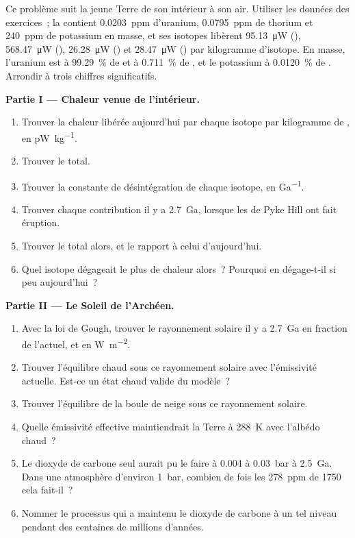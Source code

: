 \begin{problem}\label{pb:b2:precambrian-earth:1}
Ce problème suit la jeune Terre de son intérieur à son air. Utiliser les données des
exercices~; la  contient \qty{0.0203}{ppm} d'uranium, \qty{0.0795}{ppm} de
thorium et \qty{240}{ppm} de potassium en masse, et ses isotopes libèrent \qty{95.13}{\micro W}
(), \qty{568.47}{\micro W} (), \qty{26.28}{\micro W} () et
\qty{28.47}{\micro W} () par kilogramme d'isotope. En masse, l'uranium est
à \qty{99.29}{\percent} de  et à \qty{0.711}{\percent} de , et le potassium
à \qty{0.0120}{\percent} de . Arrondir à trois chiffres significatifs.

\noindent\textbf{Partie I --- Chaleur venue de l'intérieur.}
\begin{enumerate}
  \item Trouver la chaleur libérée aujourd'hui par chaque isotope par kilogramme de , en
        \unit{pW.kg^{-1}}.
  \item Trouver le total.
  \item Trouver la constante de désintégration de chaque isotope, en \unit{Ga^{-1}}.
  \item Trouver chaque contribution il y a \qty{2.7}{Ga}, lorsque les  de Pyke Hill ont fait éruption.
  \item Trouver le total alors, et le rapport à celui d'aujourd'hui.
  \item Quel isotope dégageait le plus de chaleur alors~? Pourquoi en dégage-t-il si peu aujourd'hui~?
\end{enumerate}

\noindent\textbf{Partie II --- Le Soleil de l'Archéen.}
\begin{enumerate}[resume]
  \item Avec la loi de Gough, trouver le rayonnement solaire il y a \qty{2.7}{Ga} en fraction de l'actuel, et en
        \unit{W.m^{-2}}.
  \item Trouver l'équilibre chaud sous ce rayonnement solaire avec l'émissivité actuelle. Est-ce un état chaud
        valide du modèle~?
  \item Trouver l'équilibre de la boule de neige sous ce rayonnement solaire.
  \item Quelle émissivité effective maintiendrait la Terre à \qty{288}{K} avec l'albédo chaud~?
  \item Le dioxyde de carbone seul aurait pu le faire à 0.004 à \qty{0.03}{bar} à \qty{2.5}{Ga}.
        Dans une atmosphère d'environ \qty{1}{bar}, combien de fois les \qty{278}{ppm} de 1750 cela
        fait-il~?
  \item Nommer le processus qui a maintenu le dioxyde de carbone à un tel niveau pendant des centaines de millions
        d'années.
\end{enumerate}


\end{problem}
